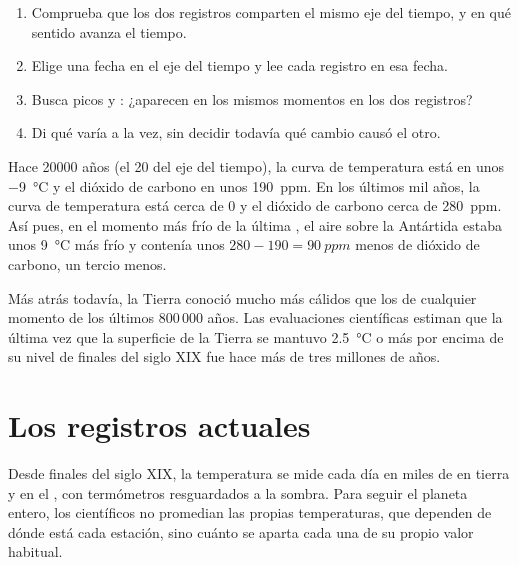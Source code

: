 \begin{method}
\begin{enumerate}
  \item Comprueba que los dos registros comparten el mismo eje del tiempo,
        y en qué sentido avanza el tiempo.
  \item Elige una fecha en el eje del tiempo y lee cada registro en esa
        fecha.
  \item Busca picos y : ¿aparecen en los mismos momentos en los dos
        registros?
  \item Di qué varía a la vez, sin decidir todavía qué cambio causó el
        otro.
\end{enumerate}
\end{method}

\begin{example}
Hace \num{20000} años (el 20 del eje del tiempo), la curva de temperatura
está en unos \qty{-9}{\degreeCelsius} y el dióxido de carbono en unos
\qty{190}{ppm}. En los últimos mil años, la curva de temperatura está
cerca de 0 y el dióxido de carbono cerca de \qty{280}{ppm}. Así pues, en
el momento más frío de la última , el aire sobre la Antártida
estaba unos \qty{9}{\degreeCelsius} más frío y contenía unos
$280 - 190 = \qty{90}{ppm}$ menos de dióxido de carbono, un tercio menos.
\end{example}

Más atrás todavía, la Tierra conoció  mucho más cálidos que los de
cualquier momento de los últimos 800\,000 años. Las evaluaciones
científicas estiman que la última vez que la superficie de la Tierra se
mantuvo \qty{2.5}{\degreeCelsius} o más por encima de su nivel de finales
del siglo XIX fue hace más de tres millones de años.

\section{Los registros actuales}

Desde finales del siglo XIX, la temperatura se mide cada día en miles de
 en tierra y en el , con termómetros
resguardados a la sombra. Para seguir el planeta entero, los científicos
no promedian las propias temperaturas, que dependen de dónde está cada
estación, sino cuánto se aparta cada una de su propio valor habitual.

